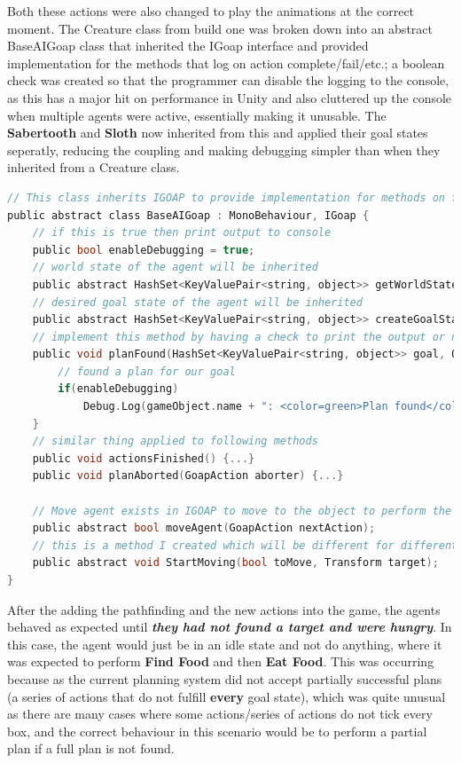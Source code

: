 \documentclass[11pt]{report}
\begin{document}
Both these actions were also changed to play the animations at the correct moment.
The Creature class from build one was broken down into an abstract BaseAIGoap class that inherited the IGoap interface and provided implementation for the methods that log on action complete/fail/etc.; a boolean check was created so that the programmer can disable the logging to the console, as this has a major hit on performance in Unity and also cluttered up the console when multiple agents were active, essentially making it unusable. The \textbf{Sabertooth} and \textbf{Sloth} now inherited from this and applied their goal states seperatly, reducing the coupling and making debugging simpler than when they inherited from a Creature class.
\begin{lstlisting}[language=c]
// This class inherits IGOAP to provide implementation for methods on finishing the plans.
public abstract class BaseAIGoap : MonoBehaviour, IGoap {
    // if this is true then print output to console
    public bool enableDebugging = true;
    // world state of the agent will be inherited
    public abstract HashSet<KeyValuePair<string, object>> getWorldState(); 
    // desired goal state of the agent will be inherited
    public abstract HashSet<KeyValuePair<string, object>> createGoalState();
    // implement this method by having a check to print the output or not
    public void planFound(HashSet<KeyValuePair<string, object>> goal, Queue<GoapAction> actions) {
        // found a plan for our goal
        if(enableDebugging)
            Debug.Log(gameObject.name + ": <color=green>Plan found</color> " + GoapAgent.prettyPrint(actions));
    }
    // similar thing applied to following methods
    public void actionsFinished() {...}
    public void planAborted(GoapAction aborter) {...}

    // Move agent exists in IGOAP to move to the object to perform the action
    public abstract bool moveAgent(GoapAction nextAction);
    // this is a method I created which will be different for different agents, it performs all the things to start and stop moving the agent.
    public abstract void StartMoving(bool toMove, Transform target);
}
\end{lstlisting}


After the adding the pathfinding and the new actions into the game, the agents behaved as expected until \textit{\textbf{they had not found a target and were hungry}}. In this case, the agent would just be in an idle state and not do anything, where it was expected to perform \textbf{Find Food} and then \textbf{Eat Food}. This was occurring because as the current planning system did not accept partially successful plans (a series of actions that do not fulfill \textbf{every} goal state), which was quite unusual as there are many cases where some actions/series of actions do not tick every box, and the correct behaviour in this scenario would be to perform a partial plan if a full plan is not found.
\end{document}
